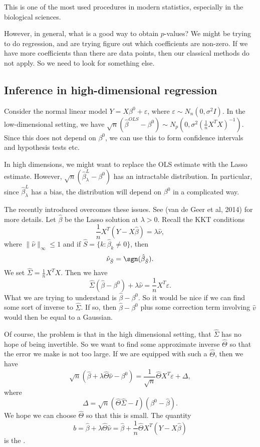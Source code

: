 \documentclass[a4paper]{article}
\begin{document}
This is one of the most used procedures in modern statistics, especially in the biological sciences.

However, in general, what is a good way to obtain $p$-values? We might be trying to do regression, and are trying figure out which coefficients are non-zero. If we have more coefficients than there are data points, then our classical methods do not apply. So we need to look for something else.

\subsection{Inference in high-dimensional regression}
Consider the normal linear model $Y = X\beta^0 + \varepsilon$, where $\varepsilon \sim N_n(0, \sigma^2 I)$. In the low-dimensional setting, we have $\sqrt{n}(\hat{\beta}^{OLS} - \beta^0) \sim N_p(0, \sigma^2(\frac{1}{n} X^T X)^{-1})$. Since this does not depend on $\beta^0$, we can use this to form confidence intervals and hypothesis tests etc.

In high dimensions, we might want to replace the OLS estimate with the Lasso estimate. However, $\sqrt{n}(\hat{\beta}_\lambda^L - \beta^0)$ has an intractable distribution. In particular, since $\hat{\beta}_\lambda^L$ has a bias, the distribution will depend on $\beta^0$ in a complicated way.

The recently introduced  overcomes these issues. See (van de Geer et al, 2014) for more details. Let $\hat{\beta}$ be the Lasso solution at $\lambda > 0$. Recall the KKT conditions
\[
  \frac{1}{n} X^T (Y - X \hat{\beta}) = \lambda \hat{\nu},
\]
where $\|\hat{\nu}\|_\infty \leq 1$ and if $\hat{S} = \{k : \hat{\beta}_k \not= 0\}$, then
\[
  \hat{\nu}_{\hat{S}} = \sgn (\hat{\beta}_{\hat{S}}).
\]
We set $\hat{\Sigma} = \frac{1}{n} X^T X$. Then we have
\[
  \hat{\Sigma} (\hat{\beta} - \beta^0) + \lambda \hat{\nu} = \frac{1}{n} X^T \varepsilon.
\]
What we are trying to understand is $\hat{\beta} - \beta^0$. So it would be nice if we can find some sort of inverse to $\hat{\Sigma}$. If so, then $\hat{\beta} - \beta^0$ plus some correction term involving $\hat{v}$ would then be equal to a Gaussian.

Of course, the problem is that in the high dimensional setting, that $\hat{\Sigma}$ has no hope of being invertible. So we want to find some approximate inverse $\hat{\Theta}$ so that the error we make is not too large. If we are equipped with such a $\hat{\Theta}$, then we have
\[
  \sqrt{n} (\hat{\beta} + \lambda \hat{\Theta} \hat{\nu} - \beta^0) = \frac{1}{\sqrt{n}} \hat{\Theta} X^T \varepsilon + \Delta,
\]
where
\[
  \Delta = \sqrt{n}(\hat{\Theta} \hat{\Sigma} - I)(\beta^0 - \hat{\beta}).
\]
We hope we can choose $\hat{\Theta}$ so that this is small. The quantity
\[
  b = \hat{\beta} + \lambda \hat{\Theta} \hat{\nu} = \hat{\beta} + \frac{1}{n} \hat{\Theta} X^T (Y - X \hat{\beta})
\]
is the .
\end{document}
